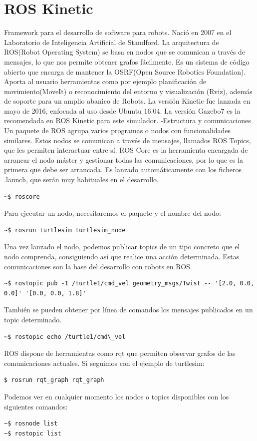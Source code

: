 \documentclass[12pt,spanish,chapterprefix, numbers=noenddot]{book}
\numberwithin{equation}{section}
\numberwithin{figure}{section}
\begin{document}
\section{ROS Kinetic}
Framework para el desarrollo de software para robots. Nació en 2007 en el Laboratorio de Inteligencia Artificial de Standford. La arquitectura de ROS(Robot Operating System) se basa en nodos que se comunican a través de mensajes, lo que nos permite obtener grafos fácilmente.
Es un sistema de código abierto que encarga de mantener la OSRF(Open Source Robotics Foundation). Aporta al usuario herramientas como por ejemplo planificación de movimiento(MoveIt) o reconocimiento del entorno y visualización (Rviz), además de soporte para un amplio abanico de Robots. 
La versión Kinetic fue lanzada en mayo de 2016, enfocada al uso desde Ubuntu 16.04. La versión Gazebo7 es la recomendada en ROS Kinetic para este simulador. 
-Estructura y comunicaciones
Un paquete de ROS agrupa varios programas o nodos con funcionalidades similares. Estos nodos se comunican  a través de mensajes, llamados ROS Topics, que les permiten interactuar entre sí. 
ROS Core es la herramienta encargada de arrancar el nodo máster y gestionar todas las comunicaciones, por lo que es la primera que debe ser arrancada. Es lanzado automáticamente con los ficheros .launch, que serán muy habituales en el desarrollo. 
\begin{lstlisting}
~$ roscore
\end{lstlisting}
Para ejecutar un nodo, necesitaremos el paquete y el nombre del nodo: 
\begin{lstlisting}
~$ rosrun turtlesim turtlesim_node
\end{lstlisting}

Una vez lanzado el nodo, podemos publicar topics de un tipo concreto que el nodo comprenda, consiguiendo así que realice una acción determinada. Estas comunicaciones son la base del desarrollo con robots en ROS. 
\begin{lstlisting}
~$ rostopic pub -1 /turtle1/cmd_vel geometry_msgs/Twist -- '[2.0, 0.0, 0.0]' '[0.0, 0.0, 1.8]'
\end{lstlisting}

También se pueden obtener por línea de comandos los mensajes publicados en un topic determinado.
\begin{lstlisting}
~$ rostopic echo /turtle1/cmd\_vel
\end{lstlisting}

ROS dispone de herramientas como rqt que permiten observar grafos de las comunicaciones actuales. Si seguimos con el ejemplo de turtlesim:
\begin{lstlisting}
$ rosrun rqt_graph rqt_graph
\end{lstlisting}
Podemos ver en cualquier momento los nodos o topics disponibles con los siguientes comandos: 
\begin{lstlisting}
~$ rosnode list 
~$ rostopic list
\end{lstlisting}
\end{document}
